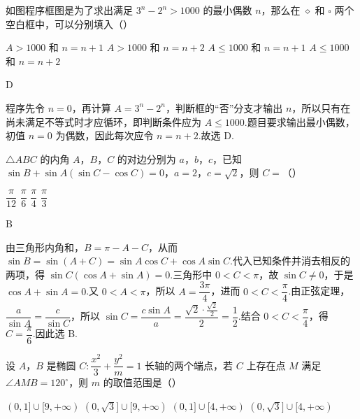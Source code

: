 \begin{problem}
如图程序框图是为了求出满足 \(3^n-2^n>1000\) 的最小偶数 \(n\)，那么在 \(\diamond\) 和 \(\square\) 两个空白框中，可以分别填入（\quad）


\choices
    {\(A>1000\) 和 \(n=n+1\)}
    {\(A>1000\) 和 \(n=n+2\)}
    {\(A\le 1000\) 和 \(n=n+1\)}
    {\(A\le 1000\) 和 \(n=n+2\)}
\end{problem}

\begin{answer}
D
\end{answer}

\begin{solution}
程序先令 \(n=0\)，再计算 \(A=3^n-2^n\)，判断框的“否”分支才输出 \(n\)，所以只有在尚未满足不等式时才应循环，即判断条件应为 \(A\le1000\).题目要求输出最小偶数，初值 \(n=0\) 为偶数，因此每次应令 \(n=n+2\).故选 D.
\end{solution}

\begin{problem}
\(\triangle ABC\) 的内角 \(A\)，\(B\)，\(C\) 的对边分别为 \(a\)，\(b\)，\(c\)，已知 \(\sin B+\sin A(\sin C-\cos C)=0\)，\(a=2\)，\(c=\sqrt2\)，则 \(C=\)（\quad）

\choices
    {\(\dfrac{\pi}{12}\)}
    {\(\dfrac{\pi}{6}\)}
    {\(\dfrac{\pi}{4}\)}
    {\(\dfrac{\pi}{3}\)}
\end{problem}

\begin{answer}
B
\end{answer}

\begin{solution}
由三角形内角和，\(B=\pi-A-C\)，从而 \(\sin B=\sin(A+C)=\sin A\cos C+\cos A\sin C\).代入已知条件并消去相反的两项，得 \(\sin C(\cos A+\sin A)=0\).三角形中 \(0<C<\pi\)，故 \(\sin C\ne0\)，于是 \(\cos A+\sin A=0\).又 \(0<A<\pi\)，所以 \(A=\dfrac{3\pi}{4}\)，进而 \(0<C<\dfrac\pi4\).由正弦定理，\(\dfrac{a}{\sin A}=\dfrac{c}{\sin C}\)，所以 \(\sin C=\dfrac{c\sin A}{a}=\dfrac{\sqrt2\cdot\frac{\sqrt2}{2}}{2}=\dfrac12\).结合 \(0<C<\dfrac\pi4\)，得 \(C=\dfrac\pi6\).因此选 B.
\end{solution}

\begin{problem}
设 \(A\)，\(B\) 是椭圆 \(C:\dfrac{x^2}{3}+\dfrac{y^2}{m}=1\) 长轴的两个端点，若 \(C\) 上存在点 \(M\) 满足 \(\angle AMB=120^\circ\)，则 \(m\) 的取值范围是（\quad）

\choices
    {\((0,1]\cup[9,+\infty)\)}
    {\((0,\sqrt3]\cup[9,+\infty)\)}
    {\((0,1]\cup[4,+\infty)\)}
    {\((0,\sqrt3]\cup[4,+\infty)\)}
\end{problem}

